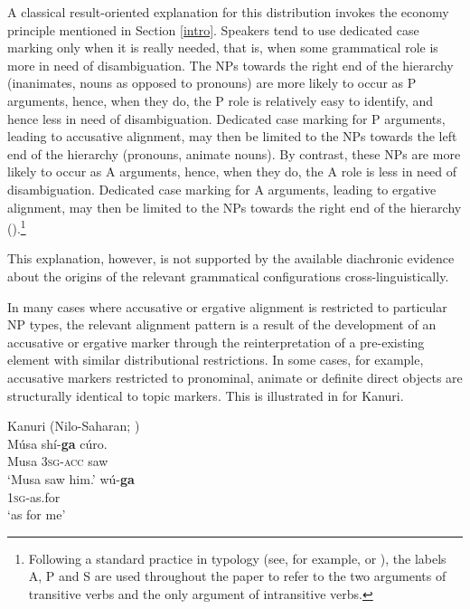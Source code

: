 \documentclass[output=paper]{langsci/langscibook}
\begin{document}
A classical result-oriented explanation  for this distribution invokes the economy
principle mentioned in Section \ref{intro}. Speakers  tend to use dedicated case marking  only when
it is really needed, that is, when some grammatical role is more in
need of disambiguation. The NPs towards the right end of the
hierarchy (inanimates, nouns as opposed to pronouns) are more likely
to occur as P arguments, hence, when they do, the P role is relatively
easy to identify, and hence less in need of disambiguation. Dedicated
case marking for P arguments, leading to accusative alignment, may
then be limited to the NPs towards the left end of the hierarchy
(pronouns, animate nouns). By contrast, these NPs are more likely to
occur as A arguments, hence, when they do, the A role is less in need
of disambiguation. Dedicated case marking for A arguments, leading to
ergative alignment, may then be limited to the NPs towards the right
end of the hierarchy
 (\citealt{Silverstein1976,Dixonergativity,Dixon1994,Comrie2,DeLancey1981,Song2001,TU2}).\footnote{Following a standard
    practice in typology (see, for example, \citealt{Comrie2} or \citealt{Dixon1994}), the labels A, P and S are used throughout
    the paper to refer to the two arguments of transitive verbs and
    the only argument of intransitive verbs.} 

This explanation, however, is not  supported by the available
diachronic evidence about the origins of the relevant grammatical configurations
cross-linguistically. 

In many cases where accusative or ergative alignment is restricted to
particular NP types, the relevant alignment pattern is a result of the
development of an accusative or ergative
marker through the reinterpretation of a pre-existing
element with similar distributional restrictions.  In some cases, for example, accusative markers restricted
to pronominal, animate or  definite direct objects are 
structurally identical to topic markers. This is illustrated  in
 for Kanuri. 


\ea\label{kanuri}
Kanuri (Nilo-Saharan; )\\
\ea
  \gll Músa sh{í}-\textbf{{ga}} cúro.\\
  Musa 3\textsc{sg-acc} saw\\
  \glt `Musa saw him.' 
  \ex
  \gll wú-\textbf{{ga}}\\
  1\textsc{sg}-as.for\\
  \glt `as for me' 
\end{document}
